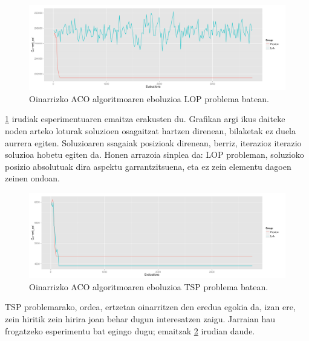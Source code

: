 \documentclass[eu]{ifirak}\usepackage[]{graphicx}\usepackage[]{color}
\begin{document}
\begin{figure}
\includegraphics[width=\textwidth]{./Irudiak/ACO_LOP-1}
\caption{Oinarrizko ACO algoritmoaren eboluzioa LOP problema batean.}\label{fig:aco_lop}
\end{figure}

\ref{fig:aco_lop} irudiak esperimentuaren emaitza erakusten du. Grafikan argi ikus daiteke noden arteko loturak soluzioen osagaitzat hartzen direnean, bilaketak ez duela aurrera egiten. Soluzioaren ssagaiak posizioak direnean, berriz, iterazioz iterazio soluzioa hobetu egiten da. Honen arrazoia sinplea da: LOP probleman, soluzioko posizio absolutuak dira aspektu garrantzitsuena, eta ez zein elementu dagoen zeinen ondoan.

\begin{figure}
\includegraphics[width=\textwidth]{./Irudiak/ACO_TSP-1}
\caption{Oinarrizko ACO algoritmoaren eboluzioa TSP problema batean.}\label{fig:aco_tsp}
\end{figure}

TSP problemarako, ordea, ertzetan oinarritzen den eredua egokia da, izan ere, zein hiritik zein hirira joan behar dugun interesatzen zaigu. Jarraian hau frogatzeko esperimentu bat egingo dugu; emaitzak \ref{fig:aco_tsp} irudian daude.
\end{document}
